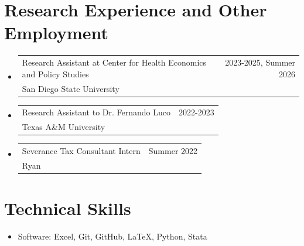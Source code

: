 \documentclass[letterpaper,11pt]{article}
\makeatletter
\newcommand{\resumeSubheading}[4]{
  \vspace{-2pt}
    \item
    \begin{tabular*}{0.97\textwidth}[t]{l@{\extracolsep{\fill}}r}
      #1 & #2 \\
      \hspace{0.15in}#3 & {#4} \\
    \end{tabular*}\vspace{-7pt}
}
\newcommand{\resumeSubSubheading}[2]{
    \item
    \begin{tabular*}{0.97\textwidth}{l@{\extracolsep{\fill}}r}
      #1 & #2 \\
    \end{tabular*}\vspace{-7pt}
}
\newcommand{\resumeSubHeadingListStart}{\begin{itemize}[leftmargin=0.15in, label={}]}
\newcommand{\resumeSubHeadingListEnd}{\end{itemize}}
\makeatother
\begin{document}
%
%

\section{Research Experience and Other Employment}
    \resumeSubHeadingListStart
      \resumeSubheading{Research Assistant at Center for 
      Health Economics and Policy Studies}{2023-2025, Summer 2026}
      {San Diego State University}{}

      \resumeSubheading{Research Assistant to Dr. Fernando Luco}{2022-2023}
      {Texas A\&M University}{}

      \resumeSubheading{Severance Tax Consultant Intern}{Summer 2022}{Ryan}{}
    \resumeSubHeadingListEnd

\section{Technical Skills}

 \begin{itemize}[leftmargin=0.15in, label={}]
    \item{
     Software{: Excel, Git, GitHub, \LaTeX, Python, Stata} \\
    }
 \end{itemize}
\end{document}
